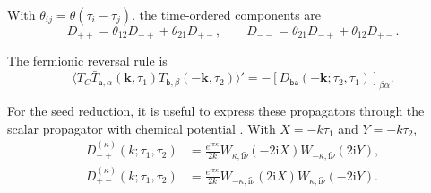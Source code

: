 \documentclass[a4paper,12pt]{article}
\newcommand{\ii}{\mathrm i}
\newcommand{\mb}{\mathbf}
\newcommand{\tn}{\tilde\nu}
\def\aa{\mathsf a}
\newcommand{\bb}{\mathsf b}
\begin{document}
With $\theta_{ij}=\theta(\tau_i-\tau_j)$, the time-ordered components are
\begin{equation}
 D_{++}=\theta_{12}D_{-+}+\theta_{21}D_{+-},\qquad
 D_{--}=\theta_{21}D_{-+}+\theta_{12}D_{+-}.
 \label{eq:dirac-sk}
\end{equation}

The fermionic reversal rule is
\begin{equation}
 \langle T_C\bar T_{\aa,\alpha}(\mb k,\tau_1)
                 T_{\bb,\beta}(-\mb k,\tau_2)\rangle'
 =-[D_{\bb\aa}(-\mb k;\tau_2,\tau_1)]_{\beta\alpha}.
 \label{eq:dirac-reversal}
\end{equation}

For the seed reduction, it is useful to express these propagators through the scalar propagator
with chemical potential \cite{qin-seed}. With
$X=-k\tau_1$ and $Y=-k\tau_2$,
\begin{align}
 D^{(\kappa)}_{-+}(k;\tau_1,\tau_2)
 &=\frac{e^{\ii\pi\kappa}}{2k}
 W_{\kappa,\ii\tn}(-2\ii X)W_{-\kappa,\ii\tn}(2\ii Y),\nonumber\\
 D^{(\kappa)}_{+-}(k;\tau_1,\tau_2)
 &=\frac{e^{\ii\pi\kappa}}{2k}
 W_{-\kappa,\ii\tn}(2\ii X)W_{\kappa,\ii\tn}(-2\ii Y).
 \label{eq:dirac-scalar-kernels}
\end{align}
\end{document}
